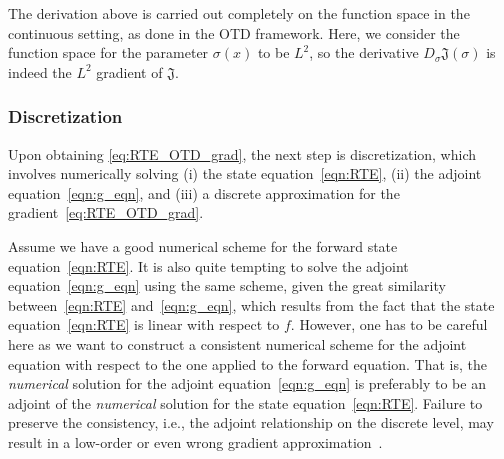 \documentclass[12pt]{amsart}
\begin{document}
The derivation above is carried out completely on the function space in the continuous setting, as done in the OTD framework. Here, we consider the function space for the parameter $\sigma(x)$ to be $L^2$, so the derivative $D_\sigma \mathfrak{J}(\sigma)$ is indeed the $L^2$ gradient of $\mathfrak{J}$. 

\subsubsection{Discretization}
Upon obtaining \eqref{eq:RTE_OTD_grad}, the next step is discretization, which involves numerically solving (i) the state equation~\eqref{eqn:RTE}, (ii) the adjoint equation~\eqref{eqn:g_eqn}, and (iii) a discrete approximation for the gradient~\eqref{eq:RTE_OTD_grad}. 

Assume we have a good numerical scheme for the forward state equation~\eqref{eqn:RTE}. It is also quite tempting to solve the adjoint equation~\eqref{eqn:g_eqn} using the same scheme, given the great similarity between~\eqref{eqn:RTE} and~\eqref{eqn:g_eqn}, which results from the fact that the state equation~\eqref{eqn:RTE} is linear with respect to $f$. However, one has to be careful here as we want to construct a consistent numerical scheme for the adjoint equation with respect to the one applied to the forward equation. That is, the \textit{numerical}  solution for the adjoint equation~\eqref{eqn:g_eqn} is preferably to be an adjoint of the \textit{numerical} solution for the state equation~\eqref{eqn:RTE}. Failure to preserve the consistency, i.e., the adjoint relationship on the discrete level, may result in a low-order or even wrong gradient approximation~\cite{hager2000runge}.
\end{document}

